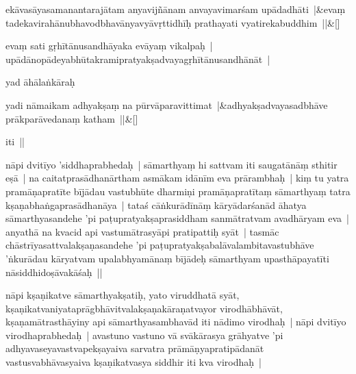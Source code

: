 \documentclass[article,12pt,a4paper]{memoir}%
\newcounter{parCount}
\begin{document}
	    
	    \stanza[\smallbreak]
	  ekāvasāyasamanantarajātam anyavijñānam anvayavimarśam upādadhāti |&evaṃ tadekavirahānubhavodbhavānyavyāvṛttidhīḥ prathayati vyatirekabuddhim ||\&[\smallbreak]
	  
	  
	  

	  
	  \pstart \leavevmode%
	\label{thakur75-72.20}evaṃ sati gṛhītānusandhāyaka evāyaṃ vikalpaḥ | upādānopādeyabhūtakramipratyakṣadvayagṛhītānusandhānāt |
	{}
	\pend%
      

	  
	  \pstart \leavevmode%
	\label{thakur75-72.21}yad āhālaṅkāraḥ
	{}
	\pend%
      
	    
	    \stanza[\smallbreak]
	  \label{ratnakīrtinibandhāvali__lg__yadi_nāmaikam}yadi nāmaikam adhyakṣaṃ na pūrvāparavittimat |&adhyakṣadvayasadbhāve prākparāvedanaṃ katham ||\&[\smallbreak]
	  
	  
	  

	  
	  \pstart \leavevmode%
	iti ||
	{}
	\pend%
      

	  
	  \pstart \leavevmode%
	\label{thakur75-72.24}nāpi dvitīyo 'siddhaprabhedaḥ | sāmarthyaṃ hi sattvam iti saugatānāṃ sthitir eṣā | na caitatprasādhanārtham asmākam idānīm eva prārambhaḥ | kiṃ tu yatra pramāṇapratīte bījādau vastubhūte dharmiṇi pramāṇapratītaṃ sāmarthyaṃ tatra kṣaṇabhaṅgaprasādhanāya |\label{thakur75-72.26} tataś cāṅkurādīnāṃ kāryādarśanād āhatya sāmarthyasandehe 'pi paṭupratyakṣaprasiddham sanmātratvam avadhāryam eva | anyathā na kvacid api vastumātrasyāpi pratipattiḥ syāt | \label{thakur75-72.29} tasmāc chāstrīyasattvalakṣaṇasandehe 'pi paṭupratyakṣabalāvalambitavastubhāve 'ṅkurādau kāryatvam upalabhyamānaṃ bījādeḥ sāmarthyam upasthāpayatīti nāsiddhidoṣāvakāśaḥ ||
	{}
	\pend%
      

	  
	  \pstart \leavevmode%
	\label{thakur75-73.3}nāpi kṣaṇikatve sāmarthyakṣatiḥ, yato viruddhatā syāt, kṣaṇikatvaniyataprāgbhāvitvalakṣaṇakāraṇatvayor virodhābhāvāt, kṣaṇamātrasthāyiny api sāmarthyasambhavād iti nādimo virodhaḥ |\label{thakur75-73.5} nāpi dvitīyo virodhaprabhedaḥ | avastuno vastuno vā svākārasya grāhyatve 'pi adhyavaseyavastvapekṣayaiva sarvatra prāmāṇyapratipādanāt vastusvabhāvasyaiva kṣaṇikatvasya siddhir iti kva virodhaḥ |
	{}
	\pend%
      
\end{document}
